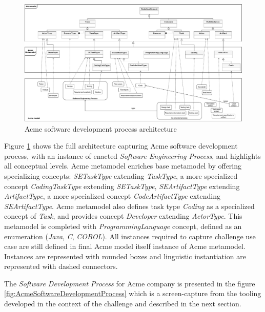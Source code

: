 \begin{figure}
 \centering
     \includegraphics[width=1.0 \textwidth]{Figures/AcmeFullArchitecture.pdf}
     \caption{Acme software development process architecture}
    \label{fig:AcmeFullArchitecture}
\end{figure}


Figure \ref{fig:AcmeFullArchitecture} shows the full architecture capturing Acme software development process, with an instance of enacted \textit{Software Engineering Process}, and highlights all conceptual levels. Acme metamodel enriches base metamodel by offering specializing concepts: \textit{SETaskType} extending \textit{TaskType}, a more specialized concept \textit{CodingTaskType} extending \textit{SETaskType}, \textit{SEArtifactType} extending \textit{ArtifactType}, a more specialized concept \textit{CodeArtifactType} extending \textit{SEArtifactType}. Acme metamodel also defines task type \textit{Coding} as a specialized concept of \textit{Task}, and provides concept \textit{Developer} extending \textit{ActorType}. This metamodel is completed with \textit{ProgrammingLanguage} concept, defined as an enumeration (\textit{Java}, \textit{C}, \textit{COBOL}). All instances required to capture challenge use case are still defined in final Acme model itself instance of Acme metamodel. Instances are represented with rounded boxes and linguistic instantiation are represented with dashed connectors.

The \textit{Software Development Process} for Acme company is presented in the figure \ref{fig:AcmeSoftwareDevelopmentProcess} which is a screen-capture from the tooling developed in the context of the challenge and described in the next section. 

